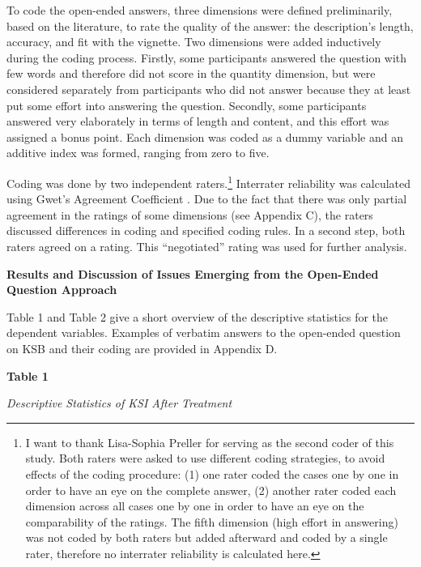 \documentclass{article}
\begin{document}
To code the open-ended answers, three dimensions were defined preliminarily, based on the literature, to rate the quality of the answer: the description's length, accuracy, and fit with the vignette. Two dimensions were added inductively during the coding process. Firstly, some participants answered the question with few words and therefore did not score in the quantity dimension, but were considered separately from participants who did not answer because they at least put some effort into answering the question. Secondly, some participants answered very elaborately in terms of length and content, and this effort was assigned a bonus point. Each dimension was coded as a dummy variable and an additive index was formed, ranging from zero to five. 

Coding was done by two independent raters.\footnote{I want to thank Lisa-Sophia Preller for serving as the second coder of this study. Both raters were asked to use different coding strategies, to avoid effects of the coding procedure: (1) one rater coded the cases one by one in order to have an eye on the complete answer, (2) another rater coded each dimension across all cases one by one in order to have an eye on the comparability of the ratings. The fifth dimension (high effort in answering) was not coded by both raters but added afterward and coded by a single rater, therefore no interrater reliability is calculated here.

} Interrater reliability was calculated using Gwet's Agreement Coefficient \parencite[][AC]{Gwet2014}. Due to the fact that there was only partial agreement in the ratings of some dimensions (see Appendix C), the raters discussed differences in coding and specified coding rules. In a second step, both raters agreed on a rating. This “negotiated” rating was used for further analysis.



\textbf{Results and Discussion of Issues Emerging from the Open-Ended Question Approach}

Table 1 and Table 2 give a short overview of the descriptive statistics for the dependent variables. Examples of verbatim answers to the open-ended question on KSB and their coding are provided in Appendix D.

\textbf{Table 1}

\emph{Descriptive Statistics of KSI After Treatment}
\end{document}
